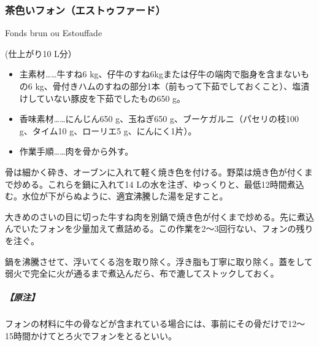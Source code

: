 \begin{recette}

\hypertarget{fonds-brun}{%
\subsubsection{茶色いフォン（エストゥファード）}\label{fonds-brun}}

\begin{frsubenv}

Fonds brun ou Estouffade

\end{frsubenv}

 

(仕上がり10 L分）

\begin{itemize}
\item
  主素材\ldots{}\ldots{}牛すね6
  kg、仔牛のすね6kgまたは仔牛の端肉で脂身を含まないもの6
  kg、骨付きハムのすねの部分1本（前もって下茹でしておくこと）、塩漬けしていない豚皮を下茹でしたもの650
  g。
\item
  香味素材\ldots{}\ldots{}にんじん650 g、玉ねぎ650
  g、ブーケガルニ（パセリの枝100 g、タイム10 g、ローリエ5
  g、にんにく1片）。
\item
  作業手順\ldots{}\ldots{}肉を骨から外す。
\end{itemize}

骨は細かく砕き、オーブンに入れて軽く焼き色を付ける。野菜は焼き色が付くまで炒める。これらを鍋に入れて14
Lの水を注ぎ、ゆっくりと、最低12時間煮込む。水位が下がらぬように、適宜沸騰した湯を足すこと。

大きめのさいの目に切った牛すね肉を別鍋で焼き色が付くまで炒める。先に煮込んでいたフォンを少量加えて煮詰める。この作業を2〜3回行ない、フォンの残りを注ぐ。

鍋を沸騰させて、浮いてくる泡を取り除く。浮き脂も丁寧に取り除く。蓋をして弱火で完全に火が通るまで煮込んだら、布で漉してストックしておく。

\hypertarget{nota-fonds-brun}{%
\subparagraph{【原注】}\label{nota-fonds-brun}}

フォンの材料に牛の骨などが含まれている場合には、事前にその骨だけで12〜
15時間かけてとろ火でフォンをとるといい。


\end{recette}
